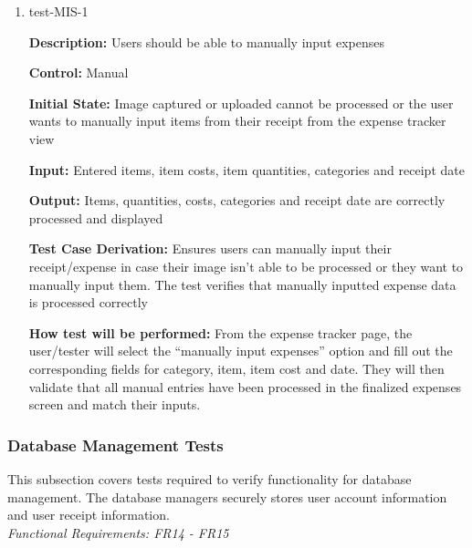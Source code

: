 \documentclass[12pt, titlepage]{article}
\begin{document}
\begin{enumerate}
\item{test-MIS-1\\}

\textbf{Description:} Users should be able to manually input expenses

\textbf{Control:} Manual

\textbf{Initial State:} Image captured or uploaded cannot be processed or the user wants to manually input items from their receipt from the expense tracker view

\textbf{Input:} Entered items, item costs, item quantities, categories and receipt date

\textbf{Output:} Items, quantities, costs, categories and receipt date are correctly processed and displayed 

\textbf{Test Case Derivation:} Ensures users can manually input their receipt/expense in case their image isn't able to be processed or they want to manually input them. The test verifies that manually inputted expense data is processed correctly

\textbf{How test will be performed:} From the expense tracker page, the user/tester will select the “manually input expenses” option and fill out the corresponding fields for category, item, item cost and date. They will then validate that all manual entries have been processed in the finalized expenses screen and match their inputs.	

\end{enumerate}

\subsubsection{Database Management Tests}

This subsection covers tests required to verify functionality for database management. The database managers securely stores user account information and user receipt information.\\
\textit{Functional Requirements: FR14 - FR15}
\end{document}
